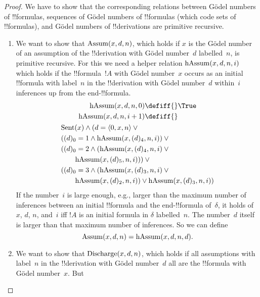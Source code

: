 \documentclass[../../../include/open-logic-section]{subfiles}
\begin{document}
\begin{proof}
We have to show that the corresponding relations between G\"odel
numbers of !!{formula}s, sequences of G\"odel numbers of !!{formula}s
(which code sets of !!{formula}s), and G\"odel numbers of !!{derivation}s 
are primitive recursive.
\begin{enumerate}
\item We want to show that $\mathrm{Assum}(x, d, n)$, which holds if $x$
  is the G\"odel number of an assumption of the !!{derivation} with
  G\"odel number~$d$ labelled~$n$, is primitive recursive. For this we
  need a helper relation $\mathrm{hAssum}(x, d, n, i)$ which holds if
  the !!{formula}~$!A$ with G\"odel number~$x$ occurs as an initial
  !!{formula} with label~$n$ in the !!{derivation} with G\"odel
  number~$d$ within~$i$ inferences up from the end-!!{formula}.
  \begin{multline*}
    \begin{aligned}
    \fn{hAssum}(x, d, n, 0) \defiff {} & \True\\   
    \fn{hAssum}(x, d, n, i+1) \defiff {} &
    \end{aligned}\\
    \begin{aligned}
      &  \fn{Sent}(x) \land (d = \tuple{0, x, n} \lor {}\\
      & ((d)_0 = 1 \land \fn{hAssum}(x, (d)_4, n, i)) \lor {}\\
      & ((d)_0 = 2 \land (\fn{hAssum}(x, (d)_4, n, i) \lor {}\\
      & \qquad\fn{hAssum}(x, (d)_5, n, i))) \lor {}\\
      & ((d)_0 = 3 \land (\fn{hAssum}(x, (d)_3, n, i) \lor {}\\
      & \qquad \fn{hAssum}(x, (d)_2, n, i)) \lor
      \fn{hAssum}(x, (d)_3, n, i))
    \end{aligned}
  \end{multline*}
  If the number~$i$ is large enough, e.g., larger than the maximum
  number of inferences between an initial !!{formula} and the
  end-!!{formula} of~$\delta$, it holds of $x$, $d$, $n$, and~$i$ iff
  $!A$ is an initial formula in $\delta$ labelled~$n$.  The number~$d$
  itself is larger than that maximum number of inferences.  So we can
  define
   \[
   \mathrm{Assum}(x, d, n) = \mathrm{hAssum}(x, d, n, d).
   \]
\item We want to show that $\mathrm{Discharge}(x, d, n)$, which holds if
  all assumptions with label~$n$ in the !!{derivation} with G\"odel
  number~$d$ all are the !!{formula} with G\"odel number~$x$.  But

\end{enumerate}
\end{proof}
\end{document}
